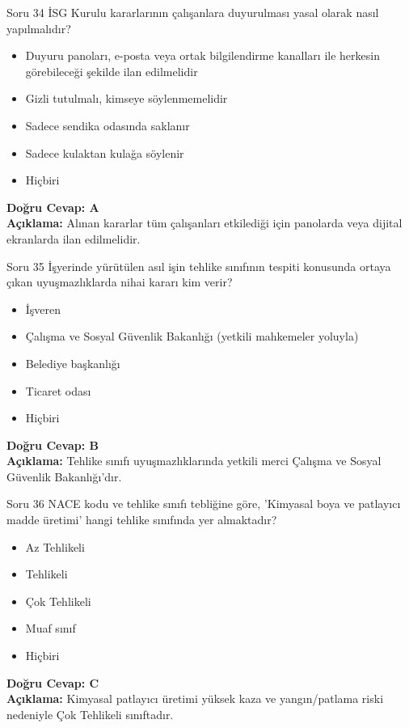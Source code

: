 \documentclass[12pt,a4paper]{article}
\begin{document}
\begin{testcard}{Soru 34}
    İSG Kurulu kararlarının çalışanlara duyurulması yasal olarak nasıl yapılmalıdır?
    \begin{itemize}
        \item[A)] Duyuru panoları, e-posta veya ortak bilgilendirme kanalları ile herkesin görebileceği şekilde ilan edilmelidir
        \item[B)] Gizli tutulmalı, kimseye söylenmemelidir
        \item[C)] Sadece sendika odasında saklanır
        \item[D)] Sadece kulaktan kulağa söylenir
        \item[E)] Hiçbiri
    \end{itemize}
    \tcblower
    \textbf{Doğru Cevap: A} \\
    \textbf{Açıklama:} Alınan kararlar tüm çalışanları etkilediği için panolarda veya dijital ekranlarda ilan edilmelidir.
\end{testcard}

\begin{testcard}{Soru 35}
    İşyerinde yürütülen asıl işin tehlike sınıfının tespiti konusunda ortaya çıkan uyuşmazlıklarda nihai kararı kim verir?
    \begin{itemize}
        \item[A)] İşveren
        \item[B)] Çalışma ve Sosyal Güvenlik Bakanlığı (yetkili mahkemeler yoluyla)
        \item[C)] Belediye başkanlığı
        \item[D)] Ticaret odası
        \item[E)] Hiçbiri
    \end{itemize}
    \tcblower
    \textbf{Doğru Cevap: B} \\
    \textbf{Açıklama:} Tehlike sınıfı uyuşmazlıklarında yetkili merci Çalışma ve Sosyal Güvenlik Bakanlığı'dır.
\end{testcard}

\begin{testcard}{Soru 36}
    NACE kodu ve tehlike sınıfı tebliğine göre, 'Kimyasal boya ve patlayıcı madde üretimi' hangi tehlike sınıfında yer almaktadır?
    \begin{itemize}
        \item[A)] Az Tehlikeli
        \item[B)] Tehlikeli
        \item[C)] Çok Tehlikeli
        \item[D)] Muaf sınıf
        \item[E)] Hiçbiri
    \end{itemize}
    \tcblower
    \textbf{Doğru Cevap: C} \\
    \textbf{Açıklama:} Kimyasal patlayıcı üretimi yüksek kaza ve yangın/patlama riski nedeniyle Çok Tehlikeli sınıftadır.
\end{testcard}
\end{document}
